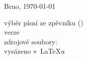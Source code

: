 \vspace*{\fill}
\noindent\zpimprintslot
\begin{otherlanguage}{czech}
Brno, \today\\
\end{otherlanguage}
\ifzpderived výběr písní ze zpěvníku \zpbooktitle{} (\zpbookauthor)\\\fi
verze \zpversion\\
\ifzpderived zdrojové soubory: \href{\zpbooksource}{\zpbooksourcetext}\\\fi
vysázeno v~\LaTeX{}u\par
\vspace{8mm}

\vspace{2cm}
\newpage
